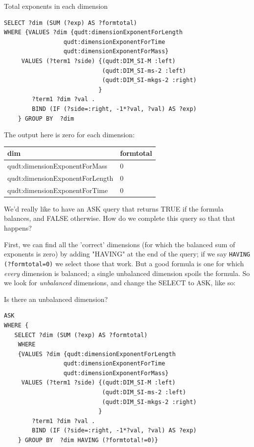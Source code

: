 \begin{query}Total exponents in each dimension\end{query}
\begin{lstlisting}
SELECT ?dim (SUM (?exp) AS ?formtotal)
WHERE {VALUES ?dim {qudt:dimensionExponentForLength 
                 qudt:dimensionExponentForTime 
                 qudt:dimensionExponentForMass}
     VALUES (?term1 ?side) {(qudt:DIM_SI-M :left)
                            (qudt:DIM_SI-ms-2 :left)
                            (qudt:DIM_SI-mkgs-2 :right)
                           }
        ?term1 ?dim ?val .
        BIND (IF (?side=:right, -1*?val, ?val) AS ?exp)
    } GROUP BY  ?dim 
\end{lstlisting}

The output here is zero for each dimension:

\begin{tabular}{|ll|}
\hline
dim&formtotal\\
\hline
qudt:dimensionExponentForMass&0\\
qudt:dimensionExponentForLength&0\\
qudt:dimensionExponentForTime&0\\
\hline
\end{tabular}

We'd really like to have an ASK query that returns TRUE if the 
formula balances, and FALSE otherwise.  How do we complete this query so that 
that happens? 

First, we can find all the 'correct' dimensions (for which the balanced sum of 
exponents is zero) by adding "HAVING" at the end of the query; if we say \texttt{HAVING (?formtotal=0)} we
select those that work.  But a good formula is one for which \emph{every} dimension
is balanced; a single unbalanced dimension spoils the formula.  So we look for \emph{unbalanced} 
dimensions, and change the SELECT to ASK, like so:

\begin{query}Is there an unbalanced dimension?\end{query}
\begin{lstlisting}
ASK
WHERE { 
   SELECT ?dim (SUM (?exp) AS ?formtotal)
    WHERE 
    {VALUES ?dim {qudt:dimensionExponentForLength 
                 qudt:dimensionExponentForTime 
                 qudt:dimensionExponentForMass}
     VALUES (?term1 ?side) {(qudt:DIM_SI-M :left)
                            (qudt:DIM_SI-ms-2 :left)
                            (qudt:DIM_SI-mkgs-2 :right)
                           }
        ?term1 ?dim ?val .
        BIND (IF (?side=:right, -1*?val, ?val) AS ?exp)
    } GROUP BY  ?dim HAVING (?formtotal!=0)}
\end{lstlisting}

